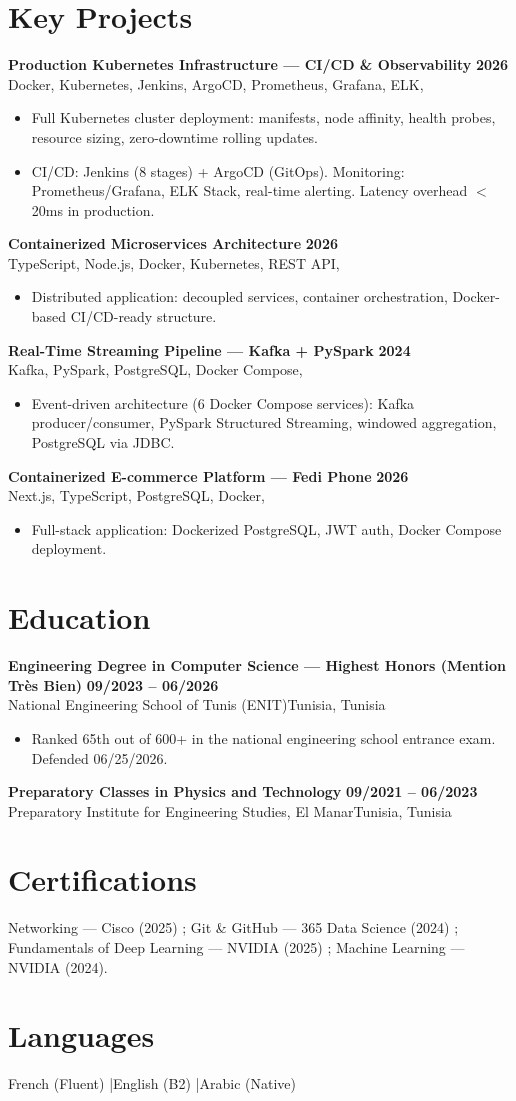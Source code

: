 \documentclass[a4paper,10pt]{article}
\newcommand{\cventry}[4]{\textbf{#1} \hfill \textbf{#4}\\[0.5pt]#2{\ifx\relax#3\relax\else, #3\fi}\par\vspace{1pt}}
\begin{document}
\section{Key Projects}
\cventry{Production Kubernetes Infrastructure --- CI/CD \& Observability}{Docker, Kubernetes, Jenkins, ArgoCD, Prometheus, Grafana, ELK}{}{2026}
\begin{itemize}
  \item Full Kubernetes cluster deployment: manifests, node affinity, health probes, resource sizing, zero-downtime rolling updates.
  \item CI/CD: Jenkins (8 stages) + ArgoCD (GitOps). Monitoring: Prometheus/Grafana, ELK Stack, real-time alerting. Latency overhead $<$20ms in production.
\end{itemize}
\cventry{Containerized Microservices Architecture}{TypeScript, Node.js, Docker, Kubernetes, REST API}{}{2026}
\begin{itemize}
  \item Distributed application: decoupled services, container orchestration, Docker-based CI/CD-ready structure.
\end{itemize}
\cventry{Real-Time Streaming Pipeline --- Kafka + PySpark}{Kafka, PySpark, PostgreSQL, Docker Compose}{}{2024}
\begin{itemize}
  \item Event-driven architecture (6 Docker Compose services): Kafka producer/consumer, PySpark Structured Streaming, windowed aggregation, PostgreSQL via JDBC.
\end{itemize}
\cventry{Containerized E-commerce Platform --- Fedi Phone}{Next.js, TypeScript, PostgreSQL, Docker}{}{2026}
\begin{itemize}
  \item Full-stack application: Dockerized PostgreSQL, JWT auth, Docker Compose deployment.
\end{itemize}
\section{Education}
\cventry{Engineering Degree in Computer Science --- Highest Honors (Mention Très Bien)}{National Engineering School of Tunis (ENIT)}{Tunisia}{09/2023 -- 06/2026}
\begin{itemize}
  \item Ranked 65th out of 600+ in the national engineering school entrance exam. Defended 06/25/2026.
\end{itemize}
\cventry{Preparatory Classes in Physics and Technology}{Preparatory Institute for Engineering Studies, El Manar}{Tunisia}{09/2021 -- 06/2023}
\section{Certifications}
Networking --- Cisco (2025) ; Git \& GitHub --- 365 Data Science (2024) ; Fundamentals of Deep Learning --- NVIDIA (2025) ; Machine Learning --- NVIDIA (2024).
\section{Languages}
French (Fluent) \quad|\quad English (B2) \quad|\quad Arabic (Native)
\end{document}
